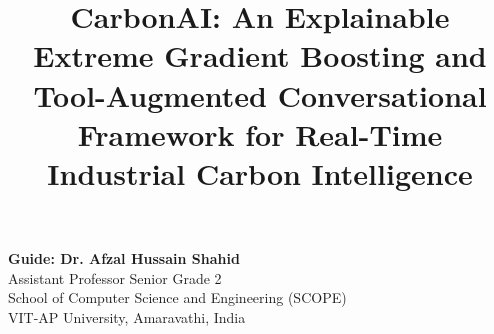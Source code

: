 \documentclass[conference]{IEEEtran}
\begin{document}
\title{CarbonAI: An Explainable Extreme Gradient Boosting and Tool-Augmented Conversational Framework for Real-Time Industrial Carbon Intelligence}

\author{
\and
{}
\and
{}
}

\maketitle

\begin{center}
\small
\textbf{Guide: Dr. Afzal Hussain Shahid}\\
Assistant Professor Senior Grade 2\\
School of Computer Science and Engineering (SCOPE)\\
VIT-AP University, Amaravathi, India
\end{center}

\vspace{0.8em}
\end{document}
